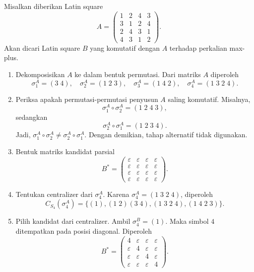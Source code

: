 \begin{contoh}\label{contoh:penerapan_algoritma_ordo_4_umum}
  Misalkan diberikan Latin square
  \[
    A=
    \begin{pmatrix}
      1 & 2 & 4 & 3 \\
      3 & 1 & 2 & 4 \\
      2 & 4 & 3 & 1 \\
      4 & 3 & 1 & 2
    \end{pmatrix}.
  \]
  Akan dicari Latin square $B$ yang komutatif dengan $A$ terhadap perkalian
  max-plus.

  \begin{enumerate}
    \item Dekomposisikan $A$ ke dalam bentuk permutasi. Dari matriks $A$
          diperoleh
          \[
            \sigma_1^A=(3\;4),\quad
            \sigma_2^A=(1\;2\;3),\quad
            \sigma_3^A=(1\;4\;2),\quad
            \sigma_4^A=(1\;3\;2\;4).
          \]

    \item Periksa apakah permutasi-permutasi penyusun $A$ saling komutatif.
          Misalnya,
          \[
            \sigma_1^A\circ\sigma_2^A=(1\;2\;4\;3),
          \]
          sedangkan
          \[
            \sigma_2^A\circ\sigma_1^A=(1\;2\;3\;4).
          \]
          Jadi, $\sigma_1^A\circ\sigma_2^A\neq
            \sigma_2^A\circ\sigma_1^A$. Dengan demikian, tahap alternatif
          tidak digunakan.

    \item Bentuk matriks kandidat parsial
          \[
            B^*=
            \begin{pmatrix}
              \varepsilon & \varepsilon & \varepsilon & \varepsilon \\
              \varepsilon & \varepsilon & \varepsilon & \varepsilon \\
              \varepsilon & \varepsilon & \varepsilon & \varepsilon \\
              \varepsilon & \varepsilon & \varepsilon & \varepsilon
            \end{pmatrix}.
          \]

    \item Tentukan centralizer dari $\sigma_4^A$. Karena
          $\sigma_4^A=(1\;3\;2\;4)$, diperoleh
          \[
            C_{S_4}(\sigma_4^A)
            =
            \{(1),(1\;2)(3\;4),(1\;3\;2\;4),(1\;4\;2\;3)\}.
          \]

    \item Pilih kandidat dari centralizer. Ambil $\sigma_4^B=(1)$. Maka
          simbol $4$ ditempatkan pada posisi diagonal. Diperoleh
          \[
            B^*=
            \begin{pmatrix}
              4           & \varepsilon & \varepsilon & \varepsilon \\
              \varepsilon & 4           & \varepsilon & \varepsilon \\
              \varepsilon & \varepsilon & 4           & \varepsilon \\
              \varepsilon & \varepsilon & \varepsilon & 4
            \end{pmatrix}.
          \]


\end{enumerate}
\end{contoh}
